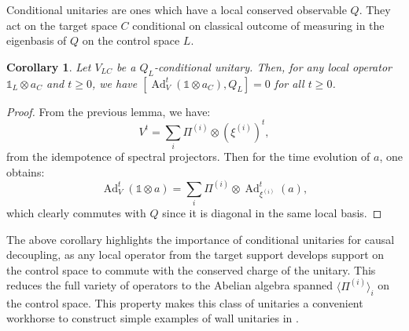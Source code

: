 \documentclass[11pt, twocolumn, floatfix, superscriptaddress, aps, prb, raggedbottom]{revtex4-2}
\makeatletter
\newtheorem{corollary}[theorem]{Corollary}
\newcommand{\Id}{\mathds{1}}
\DeclareMathOperator{\Ad}{Ad}
\newcommand{\whencolumns}[2]{\twocolumn@sw{#1}{#2}}
\makeatother
\begin{document}
Conditional unitaries are ones which have a local conserved observable $Q$. They act on the target space $C$ conditional on classical outcome of measuring in the eigenbasis of $Q$ on the control space $L$. 
\begin{corollary}
    Let $V_{LC}$ be a $Q_L$-conditional unitary. Then, for any local operator $\Id_L \otimes a_C$ and $t \geq 0$, we have $[\Ad_V^t(\Id \otimes a_C), Q_L] = 0$ for all $t \geq 0$.
\end{corollary}
\begin{proof}
    From the previous lemma, we have:
    \begin{equation}
        V^t = \sum_i \Pi^{(i)} \otimes (\xi^{(i)})^t,
    \end{equation}
    \noindent from the idempotence of spectral projectors. Then for the time evolution of $a$, one obtains: 
    \begin{equation}
        \Ad_V^t(\Id \otimes a) = \sum_i \Pi^{(i)} \otimes \Ad^t_{\xi^{(i)}}(a),
    \end{equation}
    \noindent which clearly commutes with $Q$ since it is diagonal in the same local basis.
\end{proof}
The above corollary highlights the importance of conditional unitaries for causal decoupling, as any local operator from the target support develops support on the control space to commute with the conserved charge of the unitary. This reduces the full variety of operators to the Abelian algebra spanned $ \langle \Pi^{(i)}\rangle_i $ on the control space. This property makes this class of unitaries a convenient workhorse to construct simple examples of wall unitaries in .

\whencolumns{}{\newpage}


\end{document}
